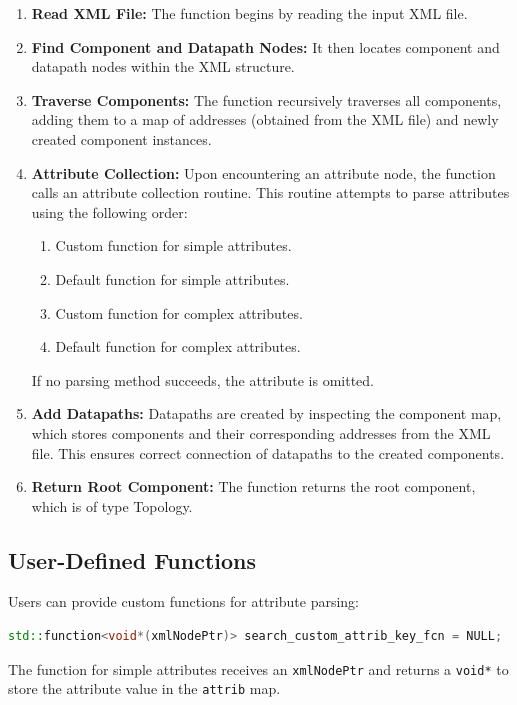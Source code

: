 \begin{enumerate}
    \item \textbf{Read XML File:} The function begins by reading the input XML file.
    \item \textbf{Find Component and Datapath Nodes:} It then locates component and datapath nodes within the XML structure.
    \item \textbf{Traverse Components:} The function recursively traverses all components, adding them to a map of addresses (obtained from the XML file) and newly created component instances.
    \item \textbf{Attribute Collection:} Upon encountering an attribute node, the function calls an attribute collection routine. This routine attempts to parse attributes using the following order:
        \begin{enumerate}
            \item Custom function for simple attributes.
            \item Default function for simple attributes.
            \item Custom function for complex attributes.
            \item Default function for complex attributes.
        \end{enumerate}
        If no parsing method succeeds, the attribute is omitted.
    \item \textbf{Add Datapaths:} Datapaths are created by inspecting the component map, which stores components and their corresponding addresses from the XML file. This ensures correct connection of datapaths to the created components.
    \item \textbf{Return Root Component:} The function returns the root component, which is of type Topology.
\end{enumerate}

\subsection{User-Defined Functions}

Users can provide custom functions for attribute parsing:

    \begin{lstlisting}[language=C++, xleftmargin=4em, frame = single]
    std::function<void*(xmlNodePtr)> search_custom_attrib_key_fcn = NULL;
    \end{lstlisting}
    The function for simple attributes receives an \verb|xmlNodePtr| and returns a \verb|void*| to store the attribute value in the \verb|attrib| map.

